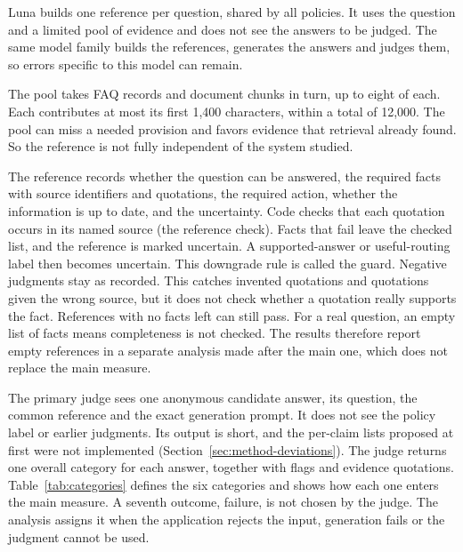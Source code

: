 Luna builds one reference per question, shared by all policies. It uses the question and a limited pool of evidence and does not see the answers to be judged. The same model family builds the references, generates the answers and judges them, so errors specific to this model can remain.



The pool takes FAQ records and document chunks in turn, up to eight of each. Each contributes at most its first 1,400 characters, within a total of 12,000. The pool can miss a needed provision and favors evidence that retrieval already found. So the reference is not fully independent of the system studied.

The reference records whether the question can be answered, the required facts with source identifiers and quotations, the required action, whether the information is up to date, and the uncertainty. Code checks that each quotation occurs in its named source (the reference check). Facts that fail leave the checked list, and the reference is marked uncertain. A supported-answer or useful-routing label then becomes uncertain. This downgrade rule is called the guard. Negative judgments stay as recorded. This catches invented quotations and quotations given the wrong source, but it does not check whether a quotation really supports the fact. References with no facts left can still pass. For a real question, an empty list of facts means completeness is not checked. The results therefore report empty references in a separate analysis made after the main one, which does not replace the main measure.

The primary judge sees one anonymous candidate answer, its question, the common reference and the exact generation prompt. It does not see the policy label or earlier judgments. Its output is short, and the per-claim lists proposed at first were not implemented (Section~\ref{sec:method-deviations}). The judge returns one overall category for each answer, together with flags and evidence quotations. Table~\ref{tab:categories} defines the six categories and shows how each one enters the main measure. A seventh outcome, failure, is not chosen by the judge. The analysis assigns it when the application rejects the input, generation fails or the judgment cannot be used.

